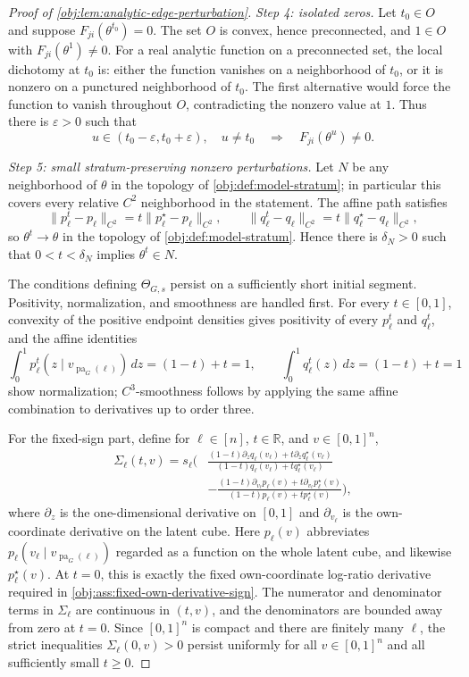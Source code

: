 \documentclass[11pt]{article}
\begin{document}
\begin{proof}[Proof of \cref{obj:lem:analytic-edge-perturbation}]
\emph{Step 4: isolated zeros.}
Let \(t_0\in O\) and suppose \(F_{ji}(\theta^{t_0})=0\).  The set \(O\) is convex, hence preconnected, and \(1\in O\) with \(F_{ji}(\theta^1)\ne0\).  For a real analytic function on a preconnected set, the local dichotomy at \(t_0\) is: either the function vanishes on a neighborhood of \(t_0\), or it is nonzero on a punctured neighborhood of \(t_0\).  The first alternative would force the function to vanish throughout \(O\), contradicting the nonzero value at \(1\).  Thus there is \(\varepsilon>0\) such that
\[
u\in(t_0-\varepsilon,t_0+\varepsilon),\quad u\ne t_0
\quad\Longrightarrow\quad
F_{ji}(\theta^u)\ne0 .
\] %

\emph{Step 5: small stratum-preserving nonzero perturbations.}
Let \(N\) be any neighborhood of \(\theta\) in the topology of \cref{obj:def:model-stratum}; in particular this covers every relative \(C^2\) neighborhood in the statement.  The affine path satisfies
\[
\|p_\ell^t-p_\ell\|_{C^2}=t\|p_\ell^\star-p_\ell\|_{C^2},
\qquad
\|q_\ell^t-q_\ell\|_{C^2}=t\|q_\ell^\star-q_\ell\|_{C^2},
\]
so \(\theta^t\to\theta\) in the topology of \cref{obj:def:model-stratum}.  Hence there is \(\delta_N>0\) such that \(0<t<\delta_N\) implies \(\theta^t\in N\).

The conditions defining \(\Theta_{G,s}\) persist on a sufficiently short initial segment.  Positivity, normalization, and smoothness are handled first.  For every \(t\in[0,1]\), convexity of the positive endpoint densities gives positivity of every \(p_\ell^t\) and \(q_\ell^t\), and the affine identities
\[
\int_0^1 p_\ell^t(z\mid v_{\operatorname{pa}_G(\ell)})\,dz=(1-t)+t=1,
\qquad
\int_0^1 q_\ell^t(z)\,dz=(1-t)+t=1
\]
show normalization; \(C^3\)-smoothness follows by applying the same affine combination to derivatives up to order three.

For the fixed-sign part, define for \(\ell\in[n]\), \(t\in\mathbb R\), and \(v\in[0,1]^n\),
\[
\begin{aligned}
\Sigma_\ell(t,v)
=s_\ell\Bigg(
&\frac{(1-t)\partial_z q_\ell(v_\ell)+t\partial_z q_\ell^\star(v_\ell)}
{(1-t)q_\ell(v_\ell)+tq_\ell^\star(v_\ell)} \\
&-\frac{(1-t)\partial_{v_\ell}p_\ell(v)+t\partial_{v_\ell}p_\ell^\star(v)}
{(1-t)p_\ell(v)+tp_\ell^\star(v)}
\Bigg),
\end{aligned}
\]
where \(\partial_z\) is the one-dimensional derivative on \([0,1]\) and \(\partial_{v_\ell}\) is the own-coordinate derivative on the latent cube.  Here \(p_\ell(v)\) abbreviates \(p_\ell(v_\ell\mid v_{\operatorname{pa}_G(\ell)})\) regarded as a function on the whole latent cube, and likewise \(p_\ell^\star(v)\).  At \(t=0\), this is exactly the fixed own-coordinate log-ratio derivative required in \cref{obj:ass:fixed-own-derivative-sign}.  The numerator and denominator terms in \(\Sigma_\ell\) are continuous in \((t,v)\), and the denominators are bounded away from zero at \(t=0\).  Since \([0,1]^n\) is compact and there are finitely many \(\ell\), the strict inequalities \(\Sigma_\ell(0,v)>0\) persist uniformly for all \(v\in[0,1]^n\) and all sufficiently small \(t\ge0\).


\end{proof}
\end{document}
